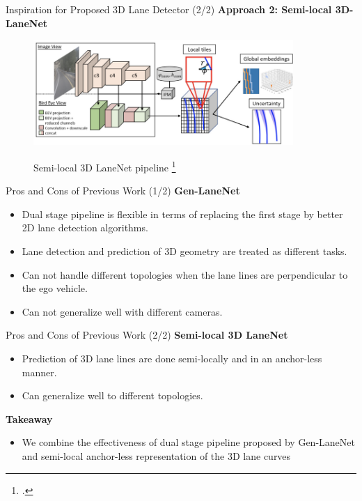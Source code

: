 \documentclass[aspectratio=169]{beamer}
\begin{document}
\begin{frame}{Inspiration for Proposed 3D Lane Detector (2/2)}
\textbf{Approach 2: Semi-local 3D-LaneNet}

 \begin{figure}[H]
     \centering
     
\includegraphics[width=0.8\linewidth, height=4cm]{images/3DLaneNET++.png} 
\label{fig:subim1}

\caption{Semi-local 3D LaneNet pipeline \footcite{DBLP:journals/corr/abs-2011-01535} }
\label{fig:image2}
\end{figure}
\end{frame}
\begin{frame}{Pros and Cons of Previous Work (1/2)}
    \textbf{Gen-LaneNet}
    
    \begin{itemize}
        \item Dual stage pipeline is flexible in terms of replacing the first stage by better 2D lane detection algorithms. 
        \item Lane detection and prediction of 3D geometry are treated as different tasks. 
        \item Can not handle different topologies when the lane lines are perpendicular to the ego vehicle.
        \item Can not generalize well with different cameras.
    \end{itemize}

\end{frame}

\begin{frame}{Pros and Cons of Previous Work (2/2)}
    \textbf{Semi-local 3D LaneNet}
    \begin{itemize}
        \item Prediction of 3D lane lines are done semi-locally and in an anchor-less manner. 
        \item Can generalize well to different topologies.
    \end{itemize}


\textbf{Takeaway}
\begin{itemize}
    \item We combine the effectiveness of dual stage pipeline proposed by Gen-LaneNet and semi-local anchor-less representation of the 3D lane curves  
\end{itemize}
\end{frame}
\end{document}
